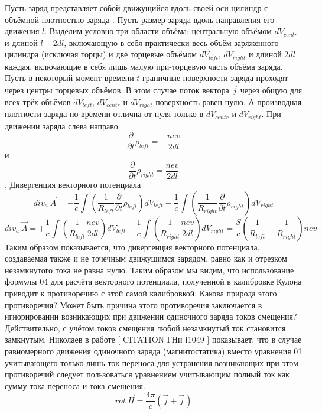 \documentclass[11pt]{article}
\begin{document}
Пусть заряд представляет собой движущийся вдоль своей оси цилиндр с
объёмной плотностью заряда . Пусть размер заряда вдоль направления его
движения \(l\). Выделим условно три области объёма: центральную объёмом
\(d{{V}_{centr}}\) и длиной \(l-2dl\), включающую в себя практически
весь объём заряженного цилиндра (исключая торцы) и две торцевые объёмом
\(d{{V}_{left}}\), \(d{{V}_{right}}\) и длиной \(2dl\) каждая,
включающие в себя лишь малую при-торцевую часть объёма заряда. Пусть в
некоторый момент времени \(t\) граничные поверхности заряда проходят
через центры торцевых объёмов. В этом случае поток вектора
\(\overrightarrow{j}\) через общую для всех трёх объёмов
\(d{{V}_{left}}\), \(d{{V}_{centr}}\) и \(d{{V}_{right}}\) поверхность
равен нулю. А производная плотности заряда по времени отлична от нуля
только в \(d{{V}_{centr}}\) и \(d{{V}_{right}}\). При движении заряда
слева направо
\[\frac{\partial }{\partial t}{{\rho }_{left}}=-\frac{nev}{2dl}\] и
\[\frac{\partial }{\partial t}{{\rho }_{right}}=\frac{nev}{2dl}\].
Дивергенция векторного потенциала
\[di{{v}_{a}}\ \overrightarrow{A}=-\frac{1}{c}\int{\left( \frac{1}{{{R}_{left}}}\frac{\partial }{\partial t}{{\rho }_{left}} \right)d{{V}_{left}}}-\frac{1}{c}\int{\left( \frac{1}{{{R}_{right}}}\frac{\partial }{\partial t}{{\rho }_{right}} \right)d{{V}_{right}}}\]
\[di{{v}_{a}}\ \overrightarrow{A}=+\frac{1}{c}\int{\left( \frac{1}{{{R}_{left}}}\frac{nev}{2dl} \right)d{{V}_{left}}}-\frac{1}{c}\int{\left( \frac{1}{{{R}_{right}}}\frac{nev}{2dl} \right)d{{V}_{right}}}=\frac{S}{c}\left( \frac{1}{{{R}_{left}}}-\frac{1}{{{R}_{right}}} \right)nev\]
Таким образом показывается, что дивергенция векторного потенциала,
создаваемая также и не точечным движущимся зарядом, равно как и отрезком
незамкнутого тока не равна нулю. Таким образом мы видим, что
использование формулы 04 для расчёта векторного потенциала, полученной в
калибровке Кулона приводит к противоречию с этой самой калибровкой.
Какова природа этого противоречия? Может быть причина этого противоречия
заключается в игнорировании возникающих при движении одиночного заряда
токов смещения? Действительно, с учётом токов смещения любой незамкнутый
ток становится замкнутым. Николаев в работе {[} CITATION ГНи \l 1049 {]}
показывает, что в случае равномерного движения одиночного заряда
(магнитостатика) вместо уравнения 01 учитывающего только лишь ток
переноса для устранения возникающих при этом противоречий следует
пользоваться уравнением учитывающим полный ток как сумму тока переноса и
тока смещения.
\[rot\ \overrightarrow{H}=\frac{4\pi }{c}\left( \overrightarrow{j}+{{\overrightarrow{j}}_{}} \right)\]
\end{document}
